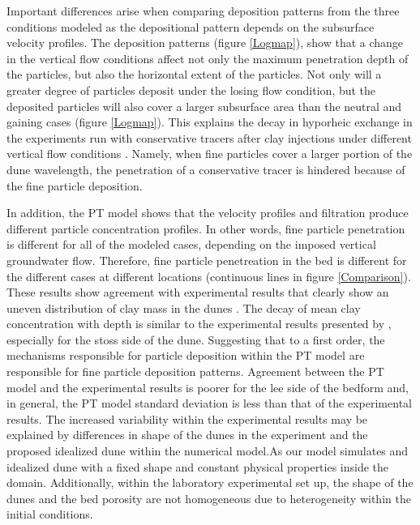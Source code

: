\documentclass[draft,linenumbers]{agujournal2018}
\begin{document}
Important differences arise when comparing deposition patterns from the three conditions modeled as the depositional pattern depends on the subsurface velocity profiles. The deposition patterns (figure \ref{Logmap}), show that a change in the vertical flow conditions affect not only the maximum penetration depth of the particles, but also the horizontal extent of the particles. Not only will a greater degree of particles deposit under the losing flow condition, but the deposited particles will also cover a larger subsurface area than the  neutral and gaining cases (figure \ref{Logmap}). This explains the decay in hyporheic exchange in the experiments run with conservative tracers after clay injections under different vertical flow conditions \citep{Fox2014,Fox2018}. Namely, when fine particles cover a larger portion of the dune wavelength, the penetration of a conservative tracer is hindered because of the fine particle deposition. 

In addition, the PT model shows that the velocity profiles and filtration produce different particle concentration profiles. In other words, fine particle penetration is different for all of the modeled cases, depending on the imposed vertical groundwater flow. Therefore, fine particle penetreation in the bed is different for the different cases at different locations (continuous lines in figure \ref{Comparison}). These results show agreement with experimental results that clearly show an uneven distribution of clay mass in the dunes \citep{Fox2018}. The decay of mean clay concentration with depth is similar to the experimental results presented by \citet{Fox2018}, especially for the stoss side of the dune. Suggesting that to a first order, the mechanisms responsible for particle deposition within the PT model are responsible for fine particle deposition patterns. Agreement between the PT model and the experimental results is poorer for the lee side of the bedform and, in general, the PT model standard deviation is less than that of the experimental results. The increased variability within the experimental results may be explained by differences in shape of the dunes in the experiment and the proposed idealized dune within the numerical model.As our model simulates and idealized dune with a fixed shape and constant physical properties inside the domain. Additionally, within the laboratory experimental set up, the shape of the dunes and the bed porosity are not homogeneous due to heterogeneity within the initial conditions.  
\end{document}
